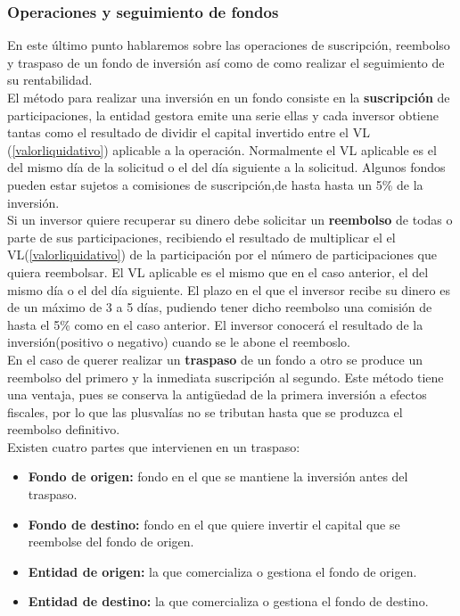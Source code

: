 \documentclass[12pt, a4paper]{article}
\begin{document}
\newpage

 \subsubsection{Operaciones y seguimiento de fondos}

En este último punto hablaremos sobre las operaciones de suscripción, reembolso y traspaso de un fondo de inversión así como de como realizar el seguimiento de su rentabilidad.\\

El método para realizar una inversión en un fondo consiste en la \textbf{suscripción} de participaciones, la entidad gestora emite una serie ellas y cada inversor obtiene tantas como el resultado de dividir el capital invertido entre el \gls{VL} (\ref{valorliquidativo}) aplicable a la operación. Normalmente el \gls{VL} aplicable es el del mismo día de la solicitud o el del día siguiente a la solicitud. Algunos fondos pueden estar sujetos a comisiones de suscripción,de hasta hasta un 5\% de la inversión.\\

Si un inversor quiere recuperar su dinero debe solicitar un \textbf{reembolso} de todas o parte de sus participaciones, recibiendo el resultado de multiplicar el el \gls{VL}(\ref{valorliquidativo}) de la participación por el número de participaciones que quiera reembolsar. El \gls{VL} aplicable es el mismo que en el caso anterior, el del mismo día o el del día siguiente. 
El plazo en el que el inversor recibe su dinero es de un máximo de 3 a 5 días, pudiendo tener dicho reembolso una comisión de hasta el 5\% como en el caso anterior. El inversor conocerá el resultado de la inversión(positivo o negativo) cuando se le abone el reemboslo.\\

En el caso de querer realizar un \textbf{traspaso} de un fondo a otro se produce un reembolso del primero y la inmediata suscripción al segundo. Este método tiene una ventaja, pues se conserva la antigüedad de la primera inversión a efectos fiscales, por lo que las plusvalías no se tributan hasta que se produzca el reembolso definitivo.\\

Existen cuatro partes que intervienen en un traspaso:

\begin{itemize}
	\item \textbf{Fondo de origen:} fondo en el que se mantiene la inversión antes del traspaso.
	\item \textbf{Fondo de destino:} fondo en el que quiere invertir el capital que se reembolse del fondo de origen.
	\item \textbf{Entidad de origen:} la que comercializa o gestiona el fondo de origen.
	\item \textbf{Entidad de destino:} la que comercializa o gestiona el fondo de destino.
\end{itemize}
\end{document}
